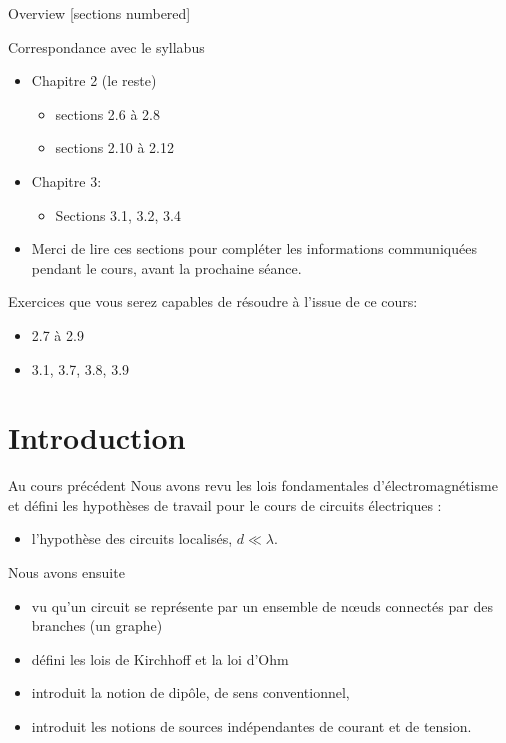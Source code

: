 \titleframe

\begin{frame}{Overview}
  [sections numbered]
  \tableofcontents[hideallsubsections]
\end{frame}






\begin{frame}{Correspondance avec le syllabus}
  \begin{itemize}
    \item Chapitre 2 (le reste)
    \begin{itemize}
      \item sections 2.6 à 2.8
      \item sections 2.10 à 2.12
    \end{itemize}
    \item Chapitre 3:
    \begin{itemize}
        \item Sections 3.1, 3.2, 3.4
    \end{itemize}
    \item Merci de lire ces sections pour compléter les informations communiquées pendant le cours, avant la prochaine séance.
  \end{itemize}

  Exercices que vous serez capables de résoudre à l’issue de ce cours:
  \begin{itemize}
    \item 2.7 à 2.9
    \item 3.1, 3.7, 3.8, 3.9
  \end{itemize}
\end{frame}

\section{Introduction} 

\begin{frame}{Au cours précédent}
Nous avons revu les lois fondamentales d’électromagnétisme et défini les hypothèses de travail pour le cours de circuits électriques : 
\begin{itemize}
  \item l’hypothèse des circuits localisés, $d \ll \lambda$.
\end{itemize}

Nous avons ensuite
\begin{itemize}
  \item  vu qu’un circuit se représente par un ensemble de n{\oe}uds connectés par des branches (un graphe)
  \item défini les lois de Kirchhoff et la loi d’Ohm
  \item introduit la notion de dipôle, de sens conventionnel,
  \item introduit les notions de sources indépendantes de courant et de tension.
\end{itemize}
\end{frame}

